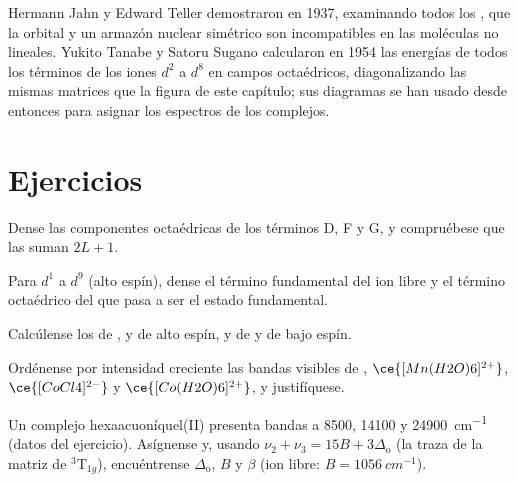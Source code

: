 \begin{history}
Hermann Jahn y Edward Teller demostraron en 1937, examinando todos los ,
que la  orbital y un armazón nuclear simétrico son incompatibles en las
moléculas no lineales. Yukito Tanabe y Satoru Sugano calcularon en 1954 las
energías de todos los términos de los iones $d^2$ a $d^8$ en campos octaédricos,
diagonalizando las mismas matrices que la figura de este capítulo; sus
diagramas se han usado desde entonces para asignar los espectros de los complejos.
\end{history}

\section{Ejercicios}

\begin{exercise}[$\star$]\label{exo:b3:complex-spectra-magnetism:1}
Dense las componentes octaédricas de los términos D, F y G, y compruébese que las
 suman $2L + 1$.
\end{exercise}

\begin{exercise}[$\star$]\label{exo:b3:complex-spectra-magnetism:2}
Para $d^1$ a $d^9$ (alto espín), dense el término fundamental del ion libre y el término octaédrico del que
pasa a ser el estado fundamental.
\end{exercise}

\begin{exercise}[$\star$]\label{exo:b3:complex-spectra-magnetism:3}
Calcúlense los  de ,  y  de alto espín, y de
 y  de bajo espín.
\end{exercise}

\begin{exercise}[$\star$]\label{exo:b3:complex-spectra-magnetism:4}
Ordénense por intensidad creciente las bandas visibles de , $\ce{[Mn(H2O)6]^{2+}}$, $\ce{[CoCl4]^{2-}}$ y
$\ce{[Co(H2O)6]^{2+}}$, y justifíquese.
\end{exercise}

\begin{exercise}[$\star\star$]\label{exo:b3:complex-spectra-magnetism:5}
Un complejo hexaacuoníquel(II) presenta bandas a 8500, 14100 y \qty{24900}{cm^{-1}} (datos del
ejercicio). Asígnense y, usando $\nu_2 + \nu_3 = 15B + 3\Delta_{\mathrm o}$ (la traza de la matriz de $^3$T$_{1g}$),
encuéntrense $\Delta_{\mathrm o}$, $B$ y $\beta$ (ion libre: $B = \qty{1056}{cm^{-1}}$).
\end{exercise}

